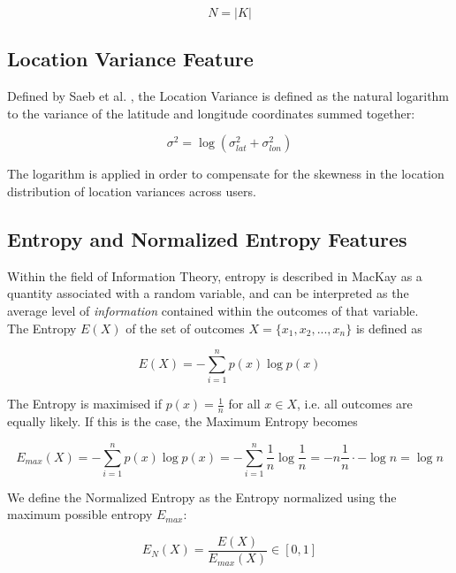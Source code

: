 \begin{equation}
\label{eq:feature-num-places}
N = |K|
\end{equation}

\subsection{Location Variance Feature}
Defined by Saeb et al. \cite{Saeb2015}, the Location Variance is defined as the natural logarithm to the variance of the latitude and longitude coordinates summed together: 

\begin{equation}
\label{eq:feature-log-var}
\sigma^2 = \log (\sigma_{lat}^2 + \sigma_{lon}^2)
\end{equation}

The logarithm is applied in order to compensate for the skewness in the location distribution of location variances across users.

\subsection{Entropy and Normalized Entropy Features}
Within the field of Information Theory, entropy is described in MacKay \cite{information-theory} as a quantity associated with a random variable, and can be interpreted as the average level of \textit{information} contained within the outcomes of that variable.\\

The Entropy $E(X)$ of the set of outcomes $X = \{x_1, x_2, ..., x_n\}$ is defined as

\begin{equation}
\label{eq:feature-entropy}
E(X) = -\sum_{i=1}^{n} p(x) \log p(x)
\end{equation}

The Entropy is maximised if $p(x) = \frac{1}{n}$ for all $x \in X$, i.e. all outcomes are equally likely. If this is the case, the Maximum Entropy becomes 

\begin{equation}
\label{eq:feature-entropy-max}
E_{max}(X) = - \sum_{i=1}^{n} p(x) \log p(x) = - \sum_{i=1}^{n} \frac{1}{n} \log \frac{1}{n} = -n \frac{1}{n} \cdot -\log n = \log n 
\end{equation}

We define the Normalized Entropy as the Entropy normalized using the maximum possible entropy $E_{max}$:

\begin{equation}
\label{eq:feature-normalized-entropy}
E_N(X) = \frac{E(X)}{E_{max}(X)} \in [0,1]
\end{equation}

